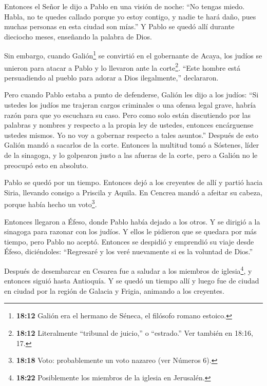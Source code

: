  Entonces el Señor le dijo a Pablo en una visión de noche:
``No tengas miedo. Habla, no te quedes callado  porque yo
estoy contigo, y nadie te hará daño, pues muchas personas en esta ciudad
son mías.''  Y Pablo se quedó allí durante dieciocho meses,
enseñando la palabra de Dios.

 Sin embargo, cuando Galión\footnote{\textbf{18:12} Galión
  era el hermano de Séneca, el filósofo romano estoico.} se convirtió en
el gobernante de Acaya, los judíos se unieron para atacar a Pablo y lo
llevaron ante la corte\footnote{\textbf{18:12} Literalmente ``tribunal
  de juicio,'' o ``estrado.'' Ver también en 18:16, 17.}. 
``Este hombre está persuadiendo al pueblo para adorar a Dios
ilegalmente,'' declararon.

 Pero cuando Pablo estaba a punto de defenderse, Galión les
dijo a los judíos: ``Si ustedes los judíos me trajeran cargos criminales
o una ofensa legal grave, habría razón para que yo escuchara su caso.
 Pero como solo están discutiendo por las palabras y
nombres y respecto a la propia ley de ustedes, entonces encárguense
ustedes mismos. Yo no voy a gobernar respecto a tales asuntos.''
 Después de esto Galión mandó a sacarlos de la corte.
 Entonces la multitud tomó a Sóstenes, líder de la
sinagoga, y lo golpearon justo a las afueras de la corte, pero a Galión
no le preocupó esto en absoluto.

 Pablo se quedó por un tiempo. Entonces dejó a los
creyentes de allí y partió hacia Siria, llevando consigo a Priscila y
Aquila. En Cencrea mandó a afeitar su cabeza, porque había hecho un
voto\footnote{\textbf{18:18} Voto: probablemente un voto nazareo (ver
  Números 6).}.

 Entonces llegaron a Éfeso, donde Pablo había dejado a los
otros. Y se dirigió a la sinagoga para razonar con los judíos.
 Y ellos le pidieron que se quedara por más tiempo, pero
Pablo no aceptó.  Entonces se despidió y emprendió su viaje
desde Éfeso, diciéndoles: ``Regresaré y los veré nuevamente si es la
voluntad de Dios.''

 Después de desembarcar en Cesarea fue a saludar a los
miembros de iglesia\footnote{\textbf{18:22} Posiblemente los miembros de
  la iglesia en Jerusalén.}, y entonces siguió hasta Antioquía.
 Y se quedó un tiempo allí y luego fue de ciudad en ciudad
por la región de Galacia y Frigia, animando a los creyentes.

